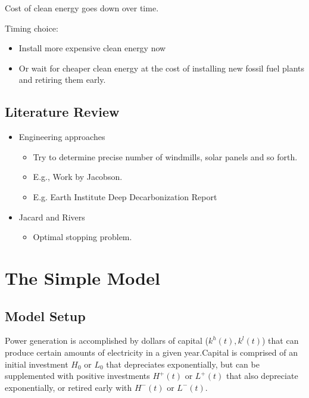 \documentclass[singlespace]{easychithesis}
\begin{document}
Cost of clean energy goes down over time. 

Timing choice: 

  \begin{itemize}

	\item{Install more expensive clean energy now}
	\item{Or wait for cheaper clean energy at the cost of installing new fossil fuel plants and retiring them early.}

\end{itemize}



\section{Literature Review}

\begin{itemize}
\item Engineering approaches

\begin{itemize}
\item Try to determine precise number of windmills, solar panels and so
forth.

\item E.g., Work by Jacobson.

\item E.g. Earth Institute Deep Decarbonization Report
\end{itemize}

\item Jacard and Rivers

\begin{itemize}
\item Optimal stopping problem.
\end{itemize}
\end{itemize}






\chapter{The Simple Model}
\section{Model Setup}

Power generation is accomplished by dollars of capital ($k^h(t), k^l(t)$) that can produce certain amounts of electricity in a given year.Capital is comprised of an initial investment $H_0$ or $L_0$ that depreciates exponentially, but can be supplemented with positive investments $H^+(t)$ or $L^+(t)$ that also depreciate exponentially, or retired early with $H^-(t)$ or $L^-(t)$.  \\
\end{document}
